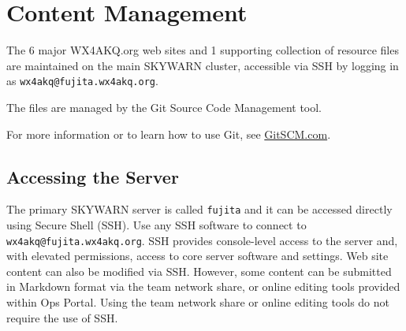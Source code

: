 \documentclass[pdflatex,letterpaper,twoside,12pt]{book}
\begin{document}






\chapter{Content Management}


The 6 major WX4AKQ.org web sites and 1 supporting collection of resource files are maintained on the main SKYWARN cluster, accessible via SSH by logging in as \texttt{wx4akq@fujita.wx4akq.org}.

The files are managed by the Git Source Code Management tool.  

For more information or to learn how to use Git, see \href{http://www.gitscm.com/}{GitSCM.com}.


\section{Accessing the Server}

The primary SKYWARN server is called \texttt{fujita} and it can be accessed directly using Secure Shell (SSH).  Use any SSH software to connect to \texttt{wx4akq@fujita.wx4akq.org}.  SSH provides console-level access to the server and, with elevated permissions, access to core server software and settings.  Web site content can also be modified via SSH.  However, some content can be submitted in Markdown format via the team network share, or online editing tools provided within Ops Portal.  Using the team network share or online editing tools do not require the use of SSH.
\end{document}
